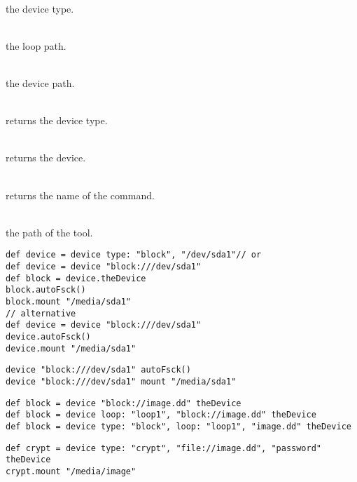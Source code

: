 \begin{asparadesc}
%
\item[\code{type}] \hfill \\
the device type.
%
\item[\code{loop}] \hfill \\
the loop path.
%
\item[\code{device}] \hfill \\
the device path.
%
\item[\code{theType}] \hfill \\
returns the device type.
%
\item[\code{theDevice}] \hfill \\
returns the device.
%
\item[\code{theName}] \hfill \\
returns the name of the command.
%
\item[\code{FILE\_COMMAND}] \hfill \\
the path of the  tool.
%
\end{asparadesc}




\begin{lstlisting}[style=Groovybash, label={lst:example_device1}, title={
Creates a block device for the device path.}]
def device = device type: "block", "/dev/sda1"// or
def device = device "block:///dev/sda1"
def block = device.theDevice
block.autoFsck()
block.mount "/media/sda1"
// alternative
def device = device "block:///dev/sda1"
device.autoFsck()
device.mount "/media/sda1"
\end{lstlisting}

\begin{lstlisting}[style=Groovybash, label={lst:example_device2}, title={
Creates a block device for the device path and apply operations on it, short syntax}]
device "block:///dev/sda1" autoFsck()
device "block:///dev/sda1" mount "/media/sda1"
\end{lstlisting}

\begin{lstlisting}[style=Groovybash, label={lst:example_device2}, title={
Creates a loop device for the image file.}]
def block = device "block://image.dd" theDevice
def block = device loop: "loop1", "block://image.dd" theDevice
def block = device type: "block", loop: "loop1", "image.dd" theDevice
\end{lstlisting}

\begin{lstlisting}[style=Groovybash, label={lst:example_device3}, title={
Passing of arguments to the created device.}]
def crypt = device type: "crypt", "file://image.dd", "password" theDevice
crypt.mount "/media/image"
\end{lstlisting}
